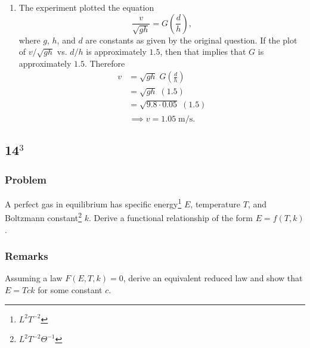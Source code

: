 \documentclass[12pt,twoside]{article}
\begin{document}
\begin{enumerate}
  \item The experiment plotted the equation
    \begin{equation*}
      \frac{v}{\sqrt{gh}} = G\left(\frac{d}{h}\right),
    \end{equation*}
    where $g$, $h$, and $d$ are constants as given by the original question. If
    the plot of $v/\sqrt{gh}$ vs. $d/h$ is approximately $1.5$, then that
    implies that $G$ is approximately $1.5$. Therefore
    \begin{equation*}
      \begin{aligned}
        v &= \sqrt{gh}\;G\left(\frac{d}{h}\right) \\
        &= \sqrt{gh}\;(1.5) \\
        &= \sqrt{9.8\cdot0.05}\;(1.5) \\
        \end{aligned}
    \end{equation*}
    \begin{equation*}
      \boxed{\implies v = 1.05\;\text{m/s}.}
    \end{equation*}
  \end{enumerate}

\subsection{14$^3$}
  \subsubsection*{Problem}
  A perfect gas in equilibrium has specific energy\footnote{$L^2T^{-2}$} $E$,
  temperature $T$, and Boltzmann constant\footnote{$L^2T^{-2}\Theta^{-1}$} $k$.
  Derive a functional relationship of the form $E=f(T,k)$.

  \subsubsection*{Remarks}
  Assuming a law $F(E,T,k)=0$, derive an equivalent reduced law and show that
  $E=Tck$ for some constant $c$.
\end{document}
